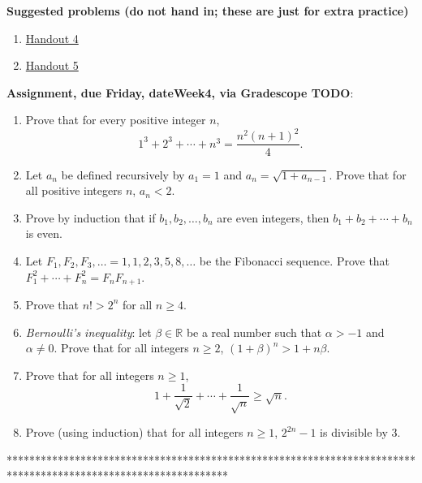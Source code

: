 \documentclass[12pt]{article}
\begin{document}
\noindent \textbf{Suggested problems (do not hand in; these are just for extra practice)}

\begin{enumerate}
\item \href{https://www.math.emory.edu/~dzb/teaching/250Fall2021/handouts/250-H04-induction-warmup.pdf}{Handout 4}
\item \href{https://www.math.emory.edu/~dzb/teaching/250Fall2021/handouts/250-H05-induction-problems.pdf}{Handout 5}
\end{enumerate}

\noindent \textbf{Assignment, due Friday, \csname dateWeek4\endcsname, via Gradescope TODO}:
\begin{enumerate}
\item Prove that for every positive integer $n$,
 $$1^3 + 2^3 + \cdots +n^3 = \frac{n^2(n+1)^2}{4}.$$ 
\item Let $a_n$ be defined recursively by $a_1 = 1$ and $a_n = \sqrt{1 + a_{n-1}}$. Prove that for all positive integers $n$, $a_n < 2$.
\item Prove by induction that if $b_1, b_2, \ldots , b_n$ are even integers, then $b_1 + b_2 + \cdots + b_n$ is even.
 \item Let $F_1, F_2, F_3, \ldots = 1,1,2,3,5,8,\ldots$ be the Fibonacci sequence. Prove that $F_1^2 + \cdots + F_n^2 = F_nF_{n+1}$.
 \item Prove that $n! > 2^n$ for all $n \geq 4$.
 \item \emph{Bernoulli's inequality}: let $\beta \in \mathbb{R}$ be a real number such that $\alpha > -1$ and $\alpha \neq 0$. Prove that for all integers $n \geq 2$, $(1 + \beta)^n > 1 + n\beta$.
 \item Prove that for all integers $n \geq 1$,
   \[
1 + \frac{1}{\sqrt{2}} + \cdots + \frac{1}{\sqrt{n}} \geq \sqrt{n}.
     \]
   \item Prove (using induction) that for all integers $n \geq 1$, $2^{2n}-1$ is divisible by 3.
 \end{enumerate}


 
***************************************************************************************************************
\newpage
\end{document}
